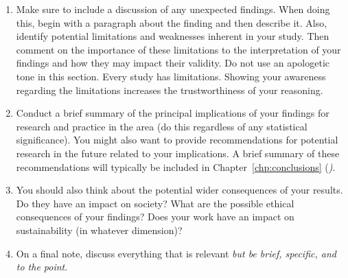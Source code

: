 \begin{enumerate}
    \item Make sure to include a discussion of any unexpected findings. When doing this, begin with a paragraph about the finding and then describe it. Also, identify potential limitations and weaknesses inherent in your study. Then comment on the importance of these limitations to the interpretation of your findings and how they may impact their validity. Do not use an apologetic tone in this section. Every study has limitations. Showing your awareness regarding the limitations increases the trustworthiness of your reasoning.
    \item Conduct a brief summary of the principal implications of your findings for research and practice in the area (do this regardless of any statistical significance). You might also want to provide recommendations for potential research in the future related to your implications. A brief summary of these recommendations will typically be included in Chapter~\ref{chp:conclusions} (\emph{)}.
    \item You should also think about the potential wider consequences of your results. Do they have an impact on society? What are the possible ethical consequences of your findings? Does your work have an impact on sustainability (in whatever dimension)?
    \item On a final note, discuss everything that is relevant \emph{but be brief, specific, and to the point}.
\end{enumerate}


